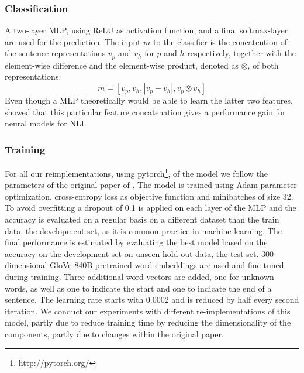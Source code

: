 \subsubsection{Classification}
A two-layer \ac{MLP}, using \ac{ReLU} as activation function, and a final softmax-layer are used for the prediction. The input $m$ to the classifier is the concatention of the sentence representations $v_p$ and $v_h$ for $p$ and $h$ respectively, together with the element-wise difference and the element-wise product, denoted as $\otimes$, of both representations:
\begin{equation}
m = [v_p, v_h, |v_p-v_h|, v_p \otimes v_h]
\end{equation}
Even though a \ac{MLP} theoretically would be able to learn the latter two features, \cite{mou2015natural} showed that this particular feature concatenation gives a performance gain for neural models for \ac{NLI}.
\subsubsection{Training}
For all our reimplementations, using pytorch\footnote{\href{http://pytorch.org/}{http://pytorch.org/}}, of the model we follow the parameters of the original paper of \cite{nie2017shortcut}. The model is trained using Adam \citep{kingma2014adam} parameter optimization, cross-entropy loss as objective function and minibatches of size 32. To avoid overfitting a dropout of 0.1 is applied on each layer of the \ac{MLP} and the accuracy is evaluated on a regular basis on a different dataset than the train data, the development set, as it is common practice in machine learning. The final performance is estimated by evaluating the best model based on the accuracy on the development set on unseen hold-out data, the test set. 300-dimensional GloVe 840B pretrained word-embeddings \citep{pennington2014glove} are used and fine-tuned during training. Three additional word-vectors are added, one for unknown words, as well as one to indicate the start and one to indicate the end of a sentence. The learning rate starts with 0.0002 and is reduced by half every second iteration. We conduct our experiments with different re-implementations of this model, partly due to reduce training time by reducing the dimensionality of the components, partly due to changes within the original paper.
